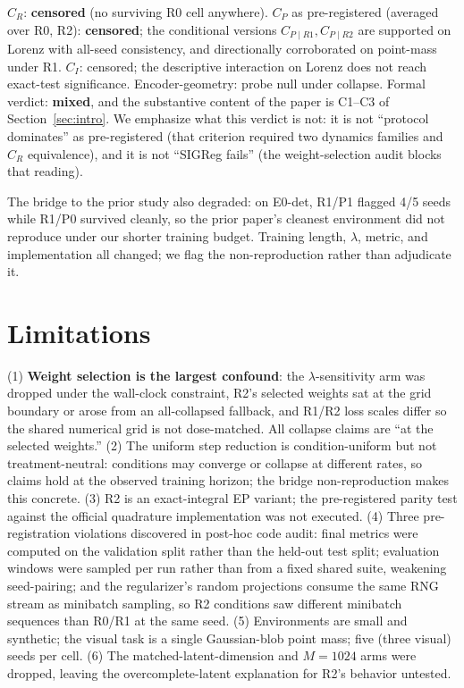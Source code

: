 \documentclass{article}
\begin{document}
$C_R$: \textbf{censored} (no surviving R0 cell anywhere). $C_P$ as pre-registered (averaged over R0, R2): \textbf{censored}; the conditional versions $C_{P\mid R1},C_{P\mid R2}$ are supported on Lorenz with all-seed consistency, and directionally corroborated on point-mass under R1. $C_I$: censored; the descriptive interaction on Lorenz does not reach exact-test significance. Encoder-geometry: probe null under collapse. Formal verdict: \textbf{mixed}, and the substantive content of the paper is C1--C3 of Section~\ref{sec:intro}. We emphasize what this verdict is not: it is not ``protocol dominates'' as pre-registered (that criterion required two dynamics families and $C_R$ equivalence), and it is not ``SIGReg fails'' (the weight-selection audit blocks that reading).

The bridge to the prior study also degraded: on E0-det, R1/P1 flagged 4/5 seeds while R1/P0 survived cleanly, so the prior paper's cleanest environment did not reproduce under our shorter training budget. Training length, $\lambda$, metric, and implementation all changed; we flag the non-reproduction rather than adjudicate it.

\section{Limitations}
\label{sec:limits}

(1) \textbf{Weight selection is the largest confound}: the $\lambda$-sensitivity arm was dropped under the wall-clock constraint, R2's selected weights sat at the grid boundary or arose from an all-collapsed fallback, and R1/R2 loss scales differ so the shared numerical grid is not dose-matched. All collapse claims are ``at the selected weights.'' (2) The uniform step reduction is condition-uniform but not treatment-neutral: conditions may converge or collapse at different rates, so claims hold at the observed training horizon; the bridge non-reproduction makes this concrete. (3) R2 is an exact-integral EP variant; the pre-registered parity test against the official quadrature implementation was not executed. (4) Three pre-registration violations discovered in post-hoc code audit: final metrics were computed on the validation split rather than the held-out test split; evaluation windows were sampled per run rather than from a fixed shared suite, weakening seed-pairing; and the regularizer's random projections consume the same RNG stream as minibatch sampling, so R2 conditions saw different minibatch sequences than R0/R1 at the same seed. (5) Environments are small and synthetic; the visual task is a single Gaussian-blob point mass; five (three visual) seeds per cell. (6) The matched-latent-dimension and $M{=}1024$ arms were dropped, leaving the overcomplete-latent explanation for R2's behavior untested.
\end{document}
